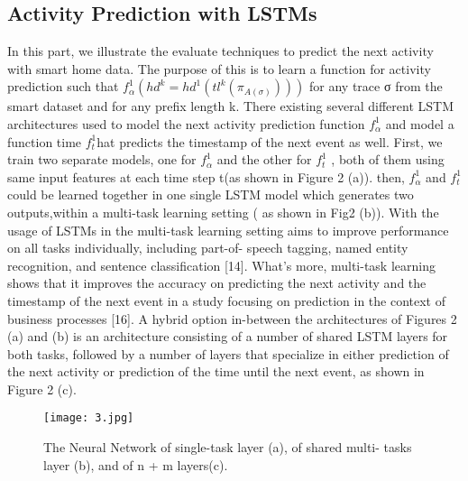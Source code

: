 \documentclass{article}
\begin{document}
\subsection{Activity Prediction with LSTMs}
In this part, we illustrate the evaluate techniques to predict the next activity with smart home data. The purpose of this is to learn a function for activity prediction such that $f_{\alpha}^{1}(hd^{k}=hd^{1}(tl^{k}(\pi_{A(\sigma)})))$ for any trace σ from the smart dataset and for any prefix length k.
There existing several different LSTM architectures used to  model the next  activity prediction function $f_{\alpha}^{1}$  and model a function time $f_{t}^{1}$hat predicts the timestamp of the next event as well. First, we train two separate models, one for  $f_{\alpha}^{1}$ and the other for $f_{t}^{1}$ , both of them using same input features at each time step t(as shown in Figure 2 (a)). then, $f_{\alpha}^{1}$ and $f_{t}^{1}$ could be learned together in one single LSTM model which generates two outputs,within a multi-task learning setting ( as shown in Fig2 (b)). With the usage of LSTMs in the multi-task learning setting aims to improve performance on all tasks individually, including part-of- speech tagging, named entity recognition, and sentence classification [14]. What’s more, multi-task learning shows that it improves the accuracy on predicting the next activity
and the timestamp of the next event in a study focusing on prediction in the context of business processes [16]. A hybrid option in-between the architectures of Figures 2 (a) and (b) is an architecture consisting of a number of shared LSTM layers for both tasks, followed by a number of layers that specialize in either prediction of the next activity or prediction of the time until the next event, as shown in Figure 2 (c).
\begin{figure}[h]
    \centering
    \texttt{[image: 3.jpg]}
    \caption{The Neural Network of single-task layer (a), of shared multi- tasks layer (b), and of n + m layers(c).}
    \label{fig:my_label}
\end{figure}
\end{document}
